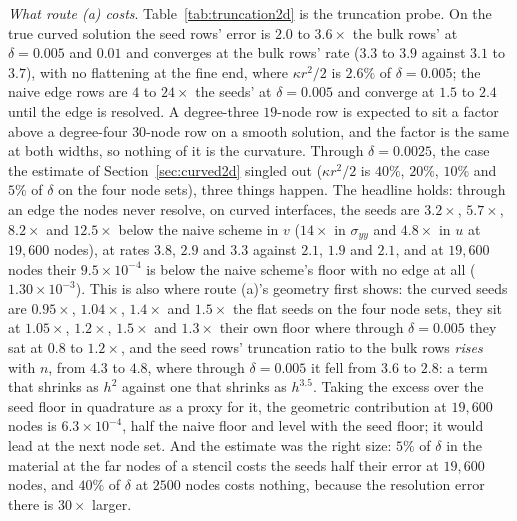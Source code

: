 \documentclass[11pt]{amsart}
\theoremstyle{definition}
\theoremstyle{remark}
\newcommand{\para}[1]{\par\smallskip\noindent\textit{#1}.\enspace}
\newcommand{\sci}[2]{\ensuremath{#1 \times 10^{#2}}}
\newcommand{\tablesetup}{\footnotesize\setlength{\tabcolsep}{2.5pt}%
  \renewcommand{\sci}[2]{\ensuremath{##1{\times}10^{##2}}}}
\begin{document}
\begin{table}
  \caption{Curved edges: relative $\ell^2$ error in $\sigma_{yy}$ at
  $t = 1$ and rates, for the runs of Table~\ref{tab:curved2d_v}. The
  seed-floor and floor rows are those runs' errors in $\sigma_{yy}$, which
  for their plane P wave equal the errors in $v$ to the digits shown.}
  \label{tab:curved2d_syy}
  \centering
  \tablesetup
  
\end{table}

\para{What route (a) costs}
Table~\ref{tab:truncation2d} is the truncation probe. On the true curved
solution the seed rows' error is $2.0$ to $3.6\times$ the bulk rows' at
$\delta = 0.005$ and $0.01$ and converges at the bulk rows' rate ($3.3$
to $3.9$ against $3.1$ to $3.7$), with no flattening at the fine end,
where $\kappa r^2 / 2$ is $2.6\%$ of $\delta = 0.005$; the naive edge
rows are $4$ to $24\times$ the seeds' at $\delta = 0.005$ and converge at
$1.5$ to $2.4$ until the edge is resolved. A degree-three $19$-node row
is expected to sit a factor above a degree-four $30$-node row on a
smooth solution, and the factor is the same at both widths, so nothing
of it is the curvature. Through $\delta = 0.0025$, the case the estimate
of Section~\ref{sec:curved2d} singled out ($\kappa r^2 / 2$ is $40\%$,
$20\%$, $10\%$ and $5\%$ of $\delta$ on the four node sets), three
things happen. The headline holds: through an edge the nodes never
resolve, on curved interfaces, the seeds are $3.2\times$, $5.7\times$,
$8.2\times$ and $12.5\times$ below the naive scheme in $v$ ($14\times$ in
$\sigma_{yy}$ and $4.8\times$ in $u$ at $19{,}600$ nodes), at rates $3.8$, $2.9$ and $3.3$ against $2.1$, $1.9$ and $2.1$, and at $19{,}600$ nodes their
$9.5 \times 10^{-4}$ is below the naive scheme's floor with no edge at
all ($1.30 \times 10^{-3}$). This is also where route (a)'s geometry
first shows: the curved seeds are $0.95\times$, $1.04\times$, $1.4\times$
and $1.5\times$ the flat seeds on the four node sets, they sit at
$1.05\times$, $1.2\times$, $1.5\times$ and $1.3\times$ their own floor
where through $\delta = 0.005$ they sat at $0.8$ to $1.2\times$, and the
seed rows' truncation ratio to the bulk rows \emph{rises} with $n$, from
$4.3$ to $4.8$, where through $\delta = 0.005$ it fell from $3.6$ to
$2.8$: a term that shrinks as $h^2$ against one that shrinks as
$h^{3.5}$. Taking the excess over the seed floor in quadrature as a proxy for it,
the geometric contribution at $19{,}600$ nodes is $6.3 \times 10^{-4}$, half
the naive floor and level with the seed floor; it would lead at the next
node set. And the estimate was the right size: $5\%$ of $\delta$ in the
material at the far nodes of a stencil costs the seeds half their error
at $19{,}600$ nodes, and $40\%$ of $\delta$ at $2500$ nodes costs nothing,
because the resolution error there is $30\times$ larger.
\end{document}
